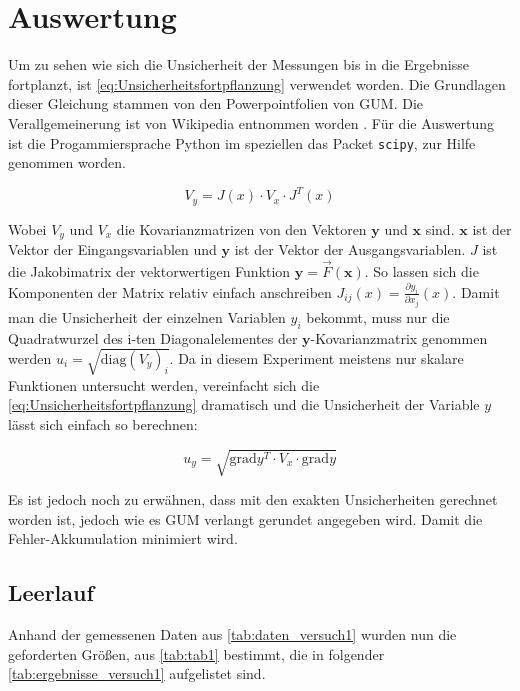 \documentclass[11pt,ngerman]{scrartcl}
\begin{document}

\section{Auswertung}

\noindent Um zu sehen wie sich die Unsicherheit der Messungen bis in die Ergebnisse
fortplanzt, ist \autoref{eq:Unsicherheitsfortpflanzung} verwendet worden.
Die Grundlagen dieser Gleichung stammen von den Powerpointfolien von
GUM.\cite{WolfgangKessel2004} Die Verallgemeinerung ist von Wikipedia entnommen
worden \cite{2020Fehler}.
Für die Auswertung ist die Progammiersprache Python im speziellen das
Packet \verb#scipy#, zur Hilfe genommen worden.

\begin{equation}
	\label{eq:Unsicherheitsfortpflanzung}
	V_y = J(x) \cdot V_x \cdot J^{T}(x)
\end{equation}

\noindent Wobei $V_y$ und $V_x$ die Kovarianzmatrizen von den Vektoren $\bm{y}$ und $\bm{x}$ sind.
$\bm{x}$ ist der Vektor der Eingangsvariablen und $\bm{y}$ ist der Vektor der Ausgangsvariablen.
$J$ ist die Jakobimatrix der vektorwertigen Funktion $\bm{y} = \vec{F}(\bm{x})$.
So lassen sich die Komponenten der Matrix relativ einfach anschreiben $J_{ij}(x) = \frac{\partial{y_i}}{\partial{x_j}}(x)$.
Damit man die Unsicherheit der einzelnen Variablen $y_i$ bekommt, muss nur die Quadratwurzel des i-ten Diagonalelementes der
$\bm{y}$-Kovarianzmatrix genommen werden $u_i= \sqrt{\mathrm{diag}(V_y)_i}$.
Da in diesem Experiment meistens nur skalare Funktionen untersucht werden, vereinfacht
sich die \autoref{eq:Unsicherheitsfortpflanzung} dramatisch und die Unsicherheit
der Variable $y$ lässt sich einfach so berechnen:

\begin{equation}
	\label{eq:graduncentainty}
	u_y = \sqrt{\mathrm{grad} y^T \cdot V_x \cdot \mathrm{grad} y}
\end{equation}

Es ist jedoch noch zu erwähnen, dass mit den exakten Unsicherheiten gerechnet
worden ist, jedoch wie es GUM verlangt gerundet angegeben wird. Damit die
Fehler-Akkumulation minimiert wird.
\subsection{Leerlauf}

Anhand der gemessenen Daten aus \autoref{tab:daten_versuch1} wurden
nun die geforderten Größen, aus \autoref{tab:tab1}
bestimmt, die in folgender \autoref{tab:ergebnisse_versuch1}
aufgelistet sind.
\end{document}
